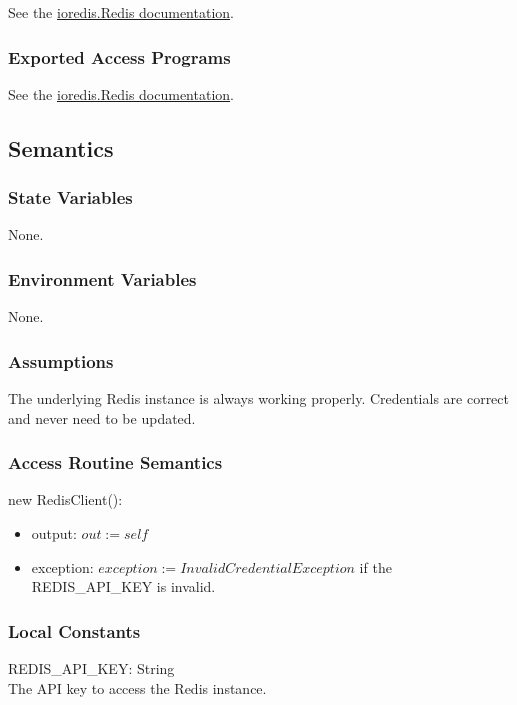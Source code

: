 \documentclass[12pt, titlepage]{article}
\begin{document}
See the \href{https://luin.github.io/ioredis/classes/Redis.html}{ioredis.Redis documentation}. 

\subsubsection{Exported Access Programs}

See the \href{https://luin.github.io/ioredis/classes/Redis.html}{ioredis.Redis documentation}.

\subsection{Semantics}

\subsubsection{State Variables}

None.

\subsubsection{Environment Variables}

None.

\subsubsection{Assumptions}

The underlying Redis instance is always working properly. Credentials are correct and never need to be updated.

\subsubsection{Access Routine Semantics}

\noindent new RedisClient():
\begin{itemize} 
\item output: $out := self$ 
\item exception: $exception := InvalidCredentialException$ if the REDIS\_API\_KEY is invalid.  
\end{itemize} 

\subsubsection{Local Constants}

REDIS\_API\_KEY: String \\
The API key to access the Redis instance.
  
\end{document}
